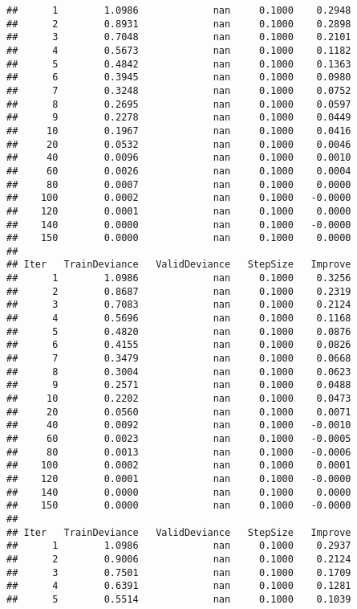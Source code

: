 \documentclass[
]{article}
\begin{document}
\begin{verbatim}
##      1        1.0986             nan     0.1000    0.2948
##      2        0.8931             nan     0.1000    0.2898
##      3        0.7048             nan     0.1000    0.2101
##      4        0.5673             nan     0.1000    0.1182
##      5        0.4842             nan     0.1000    0.1363
##      6        0.3945             nan     0.1000    0.0980
##      7        0.3248             nan     0.1000    0.0752
##      8        0.2695             nan     0.1000    0.0597
##      9        0.2278             nan     0.1000    0.0449
##     10        0.1967             nan     0.1000    0.0416
##     20        0.0532             nan     0.1000    0.0046
##     40        0.0096             nan     0.1000    0.0010
##     60        0.0026             nan     0.1000    0.0004
##     80        0.0007             nan     0.1000    0.0000
##    100        0.0002             nan     0.1000   -0.0000
##    120        0.0001             nan     0.1000    0.0000
##    140        0.0000             nan     0.1000   -0.0000
##    150        0.0000             nan     0.1000    0.0000
## 
## Iter   TrainDeviance   ValidDeviance   StepSize   Improve
##      1        1.0986             nan     0.1000    0.3256
##      2        0.8687             nan     0.1000    0.2319
##      3        0.7083             nan     0.1000    0.2124
##      4        0.5696             nan     0.1000    0.1168
##      5        0.4820             nan     0.1000    0.0876
##      6        0.4155             nan     0.1000    0.0826
##      7        0.3479             nan     0.1000    0.0668
##      8        0.3004             nan     0.1000    0.0623
##      9        0.2571             nan     0.1000    0.0488
##     10        0.2202             nan     0.1000    0.0473
##     20        0.0560             nan     0.1000    0.0071
##     40        0.0092             nan     0.1000   -0.0010
##     60        0.0023             nan     0.1000   -0.0005
##     80        0.0013             nan     0.1000   -0.0006
##    100        0.0002             nan     0.1000    0.0001
##    120        0.0001             nan     0.1000   -0.0000
##    140        0.0000             nan     0.1000    0.0000
##    150        0.0000             nan     0.1000   -0.0000
## 
## Iter   TrainDeviance   ValidDeviance   StepSize   Improve
##      1        1.0986             nan     0.1000    0.2937
##      2        0.9006             nan     0.1000    0.2124
##      3        0.7501             nan     0.1000    0.1709
##      4        0.6391             nan     0.1000    0.1281
##      5        0.5514             nan     0.1000    0.1039

\end{verbatim}
\end{document}
